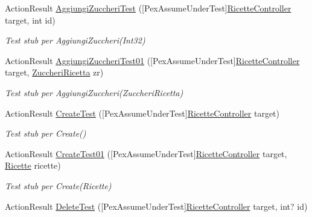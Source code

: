 \begin{DoxyCompactItemize}
Action\+Result \mbox{\hyperlink{class_brew_day2_1_1_controllers_1_1_tests_1_1_ricette_controller_test_a01af8b679bfad22dc9c7fc5d6f9f2aca}{Aggiungi\+Zuccheri\+Test}} (\mbox{[}Pex\+Assume\+Under\+Test\mbox{]}\mbox{\hyperlink{class_brew_day2_1_1_controllers_1_1_ricette_controller}{Ricette\+Controller}} target, int id)
\begin{DoxyCompactList}\small\item\em Test stub per Aggiungi\+Zuccheri(\+Int32)\end{DoxyCompactList}\item 
Action\+Result \mbox{\hyperlink{class_brew_day2_1_1_controllers_1_1_tests_1_1_ricette_controller_test_a6821340a44be8bdf4eaa6fe82e996a1c}{Aggiungi\+Zuccheri\+Test01}} (\mbox{[}Pex\+Assume\+Under\+Test\mbox{]}\mbox{\hyperlink{class_brew_day2_1_1_controllers_1_1_ricette_controller}{Ricette\+Controller}} target, \mbox{\hyperlink{class_brew_day2_1_1_models_1_1_zuccheri_ricetta}{Zuccheri\+Ricetta}} zr)
\begin{DoxyCompactList}\small\item\em Test stub per Aggiungi\+Zuccheri(\+Zuccheri\+Ricetta)\end{DoxyCompactList}\item 
Action\+Result \mbox{\hyperlink{class_brew_day2_1_1_controllers_1_1_tests_1_1_ricette_controller_test_afe459f8725021794276a52b8310439d2}{Create\+Test}} (\mbox{[}Pex\+Assume\+Under\+Test\mbox{]}\mbox{\hyperlink{class_brew_day2_1_1_controllers_1_1_ricette_controller}{Ricette\+Controller}} target)
\begin{DoxyCompactList}\small\item\em Test stub per Create()\end{DoxyCompactList}\item 
Action\+Result \mbox{\hyperlink{class_brew_day2_1_1_controllers_1_1_tests_1_1_ricette_controller_test_a48d2ee306301e1ad0df104c566d50403}{Create\+Test01}} (\mbox{[}Pex\+Assume\+Under\+Test\mbox{]}\mbox{\hyperlink{class_brew_day2_1_1_controllers_1_1_ricette_controller}{Ricette\+Controller}} target, \mbox{\hyperlink{class_brew_day2_1_1_models_1_1_ricette}{Ricette}} ricette)
\begin{DoxyCompactList}\small\item\em Test stub per Create(\+Ricette)\end{DoxyCompactList}\item 
Action\+Result \mbox{\hyperlink{class_brew_day2_1_1_controllers_1_1_tests_1_1_ricette_controller_test_a6fc17d02986a7801435834fa67281782}{Delete\+Test}} (\mbox{[}Pex\+Assume\+Under\+Test\mbox{]}\mbox{\hyperlink{class_brew_day2_1_1_controllers_1_1_ricette_controller}{Ricette\+Controller}} target, int? id)

\end{DoxyCompactItemize}
